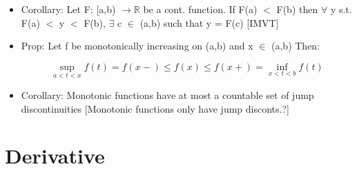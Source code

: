 \documentclass[11pt]{article}
\begin{document}
\begin{itemize}
\item Corollary: Let F: [a,b) $\rightarrow \mathbb{R}$ be a cont. function. If
  F(a) $<$ F(b) then $\forall$ y s.t. F(a) $<$ y $<$ F(b), $\exists$ c $\in$
  (a,b) such that y = F(c) [IMVT]

\item Prop: Let f be monotonically increasing on (a,b) and x $\in$ (a,b) Then:

  $$ \sup_{a < t < x} f(t) = f(x-) \leq f(x) \leq f(x+) = \inf_{x < t < b}
  f(t) $$

\item Corollary: Monotonic functions have at most a countable set of jump
  discontinuities [Monotonic functions only have jump disconts.?]

\end{itemize}

\section{Derivative}
\end{document}
